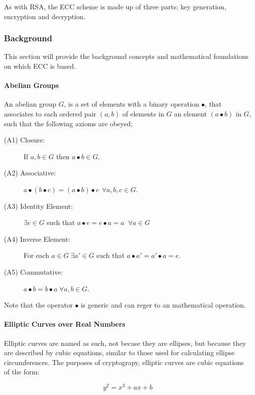 \documentclass[a4paper,12pt]{report}
\begin{document}
As with RSA, the ECC scheme is made up of three parts; key generation, encryption and decryption.

\subsubsection{Background}

This section will provide the background concepts and mathematical foundations on which ECC is based.

\paragraph{Abelian Groups}

An abelian group $G$, is a set of elements with a binary operation $\bullet$, that associates to each ordered pair $(a,b)$ of elements in $G$ an element $(a \bullet b)$ in $G$, such that the following axioms are obeyed;

\begin{description}
 \item[(A1) Closure:] If $a , b \in G$ then $a \bullet b \in G$.
 \item[(A2) Associative:] $a \bullet (b \bullet c) = (a \bullet b) \bullet c \:\: \forall a,b,c \in G$.
 \item[(A3) Identity Element:] $\exists e \in G$ such that $a \bullet e = e \bullet a = a \;\; \forall a \in G$
 \item[(A4) Inverse Element:] For each $a \in G \; \exists a' \in G$ such that $a \bullet a' = a' \bullet a = e$.
 \item[(A5) Commutative:] $a \bullet b = b \bullet a \; \forall a,b \in G$. 
\end{description}

Note that the operator $\bullet$ is generic and can reger to an mathematical operation. 

\paragraph{Elliptic Curves over Real Numbers}

Elliptic curves are named as such, not becase they are ellipses, but because they are described by cubic equations, similar to those used for calculating ellipse circumferences. The purposes of cryptograpy, elliptic curves are cubic equations of the form:

\begin{equation}
y^2 = x^3 + ax + b 
\label{eq:mainecceq}
\end{equation}
\end{document}
